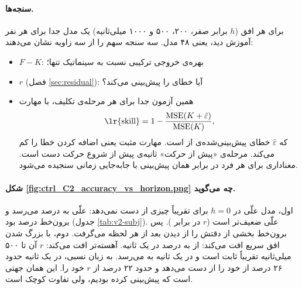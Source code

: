 \paragraph{سنجه‌ها.} برای هر افق ($h$ برابر صفر، ۲۰۰، ۵۰۰ و ۱۰۰۰ میلی‌ثانیه) یک مدل جدا برای هر نفر آموزش دید، یعنی ۴۸ مدل. سه سنجه سهم  را از سه زاویه نشان می‌دهند:
\begin{itemize}
\item $F-K$: بهره‌ی  خروجی ترکیبی نسبت به سینماتیک تنها؛
\item $r$  (فصل \ref{sec:residual}): آیا  خطای  را پیش‌بینی می‌کند؟
\item همین آزمون جدا برای هر مرحله‌ی تکلیف، با مهارت
\begin{equation}
\text{\lr{skill}}=1-\frac{\mathrm{MSE}(K+\hat\varepsilon)}{\mathrm{MSE}(K)},
\end{equation}
که $\hat\varepsilon$ خطای پیش‌بینی‌شده‌ی  از  است. مهارت مثبت یعنی اضافه کردن  خطا را کم می‌کند. مرحله‌ی «پیش از حرکت» ثانیه‌ی پیش از شروع حرکت دست است. معناداری برای هر فرد در برابر همان پیش‌بینی با جابه‌جایی زمانی سنجیده می‌شود.
\end{itemize}




\paragraph{شکل \ref{fig:ctrl_C2_accuracy_vs_horizon.png} چه می‌گوید.} اول، مدل علّی در $h=0$ برای  تقریباً چیزی از دست نمی‌دهد:  علّی به   درصد می‌رسد و  برون‌خط  درصد بود (جدول \ref{tab:v2-subj}).  علّی ضعیف‌تر است ($r$  در برابر ). پس  برون‌خط بخشی از دقتش را از دیدن  بعد از هر لحظه می‌گرفت. دوم، با بزرگ شدن افق  سریع افت می‌کند: از  به  درصد در یک ثانیه.  آهسته‌تر افت می‌کند: $r$ آن تا ۵۰۰ میلی‌ثانیه تقریباً ثابت است و در یک ثانیه به  می‌رسد. به زبان نسبی،  در یک ثانیه حدود ۲۶ درصد از  خود را از دست می‌دهد و  حدود ۲۲ درصد از $r$ خود را. این همان جهتی است که پیش‌بینی کرده بودیم، ولی تفاوت کوچک است.


